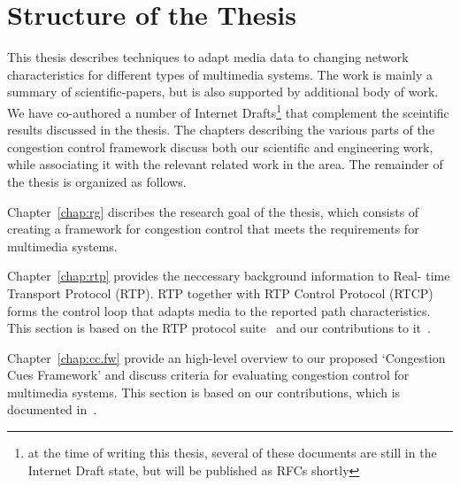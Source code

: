 \section{Structure of the Thesis}

This thesis describes techniques to adapt media data to changing network
characteristics for different types of multimedia systems. The work is mainly
a summary of scientific-papers, but is also supported by additional body of
work. We have co-authored a number of Internet Drafts\footnote{at the time of
writing this thesis, several of these documents are still in the Internet
Draft state, but will be published as RFCs shortly} that complement the
sceintific results discussed in the thesis. The chapters describing the
various parts of the congestion control framework discuss both our scientific
and engineering work, while associating it with the relevant related work in
the area. The remainder of the thesis is organized as follows.

Chapter~\ref{chap:rg} discribes the research goal of the thesis, which consists
of creating a framework for congestion control that meets the requirements for
multimedia systems.


Chapter~\ref{chap:rtp} provides the neccessary background information to Real-
time Transport Protocol (RTP). RTP together with RTP Control Protocol (RTCP)
forms the control loop that adapts media to the reported path characteristics.
This section is based on the RTP protocol suite~\cite{rfc3550, rfc4585,
rfc3611, rfc5104, rfc5506} and our contributions to
it~\cite{draft.xr.discard.rle, draft.xr.jb}.

Chapter~\ref{chap:cc.fw} provide an high-level overview to our proposed
`Congestion Cues Framework' and discuss criteria for evaluating congestion
control for multimedia systems. This section is based on our contributions,
which is documented in~\cite{draft.rmcat.evaluate, Singh:PhDFw}.



